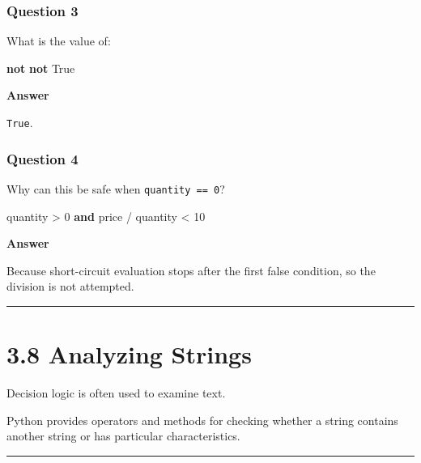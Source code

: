 \documentclass[
  11pt,
  a4paper,
]{article}
\newenvironment{Shaded}{}{}
\newcommand{\DecValTok}[1]{\textcolor[rgb]{0.25,0.63,0.44}{#1}}
\newcommand{\KeywordTok}[1]{\textcolor[rgb]{0.00,0.44,0.13}{\textbf{#1}}}
\newcommand{\NormalTok}[1]{#1}
\newcommand{\OperatorTok}[1]{\textcolor[rgb]{0.40,0.40,0.40}{#1}}
\newcommand{\VariableTok}[1]{\textcolor[rgb]{0.10,0.09,0.49}{#1}}
\begin{document}
\subsubsection{Question 3}\label{question-3-3}

What is the value of:

\begin{Shaded}
\begin{Highlighting}[]
\KeywordTok{not} \KeywordTok{not} \VariableTok{True}
\end{Highlighting}
\end{Shaded}

\textbf{Answer}

\texttt{True}.

\subsubsection{Question 4}\label{question-4-2}

Why can this be safe when \texttt{quantity\ ==\ 0}?

\begin{Shaded}
\begin{Highlighting}[]
\NormalTok{quantity }\OperatorTok{\textgreater{}} \DecValTok{0} \KeywordTok{and}\NormalTok{ price }\OperatorTok{/}\NormalTok{ quantity }\OperatorTok{\textless{}} \DecValTok{10}
\end{Highlighting}
\end{Shaded}

\textbf{Answer}

Because short-circuit evaluation stops after the first false condition,
so the division is not attempted.

\begin{center}\rule{0.5\linewidth}{0.5pt}\end{center}

\section{3.8 Analyzing Strings}\label{analyzing-strings}

Decision logic is often used to examine text.

Python provides operators and methods for checking whether a string
contains another string or has particular characteristics.

\begin{center}\rule{0.5\linewidth}{0.5pt}\end{center}
\end{document}
